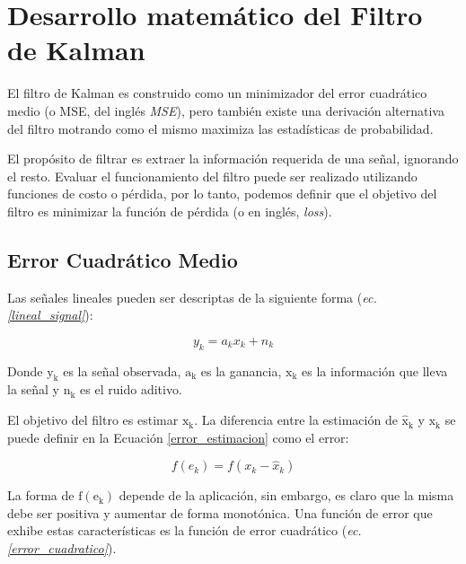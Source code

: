 \documentclass[10pt,a4paper]{article}
\begin{document}
\newpage

\printbibliography[heading=bibintoc]

\newpage

\appendix 

\section{Desarrollo matem\'atico del Filtro de Kalman}\label{matKalman}

\noindent El filtro de Kalman es construido como un minimizador del error 
cuadr\'atico medio (o \acrshort{MSE}, del ingl\'es 
\emph{\acrlong{MSE}}), pero tambi\'en existe una derivaci\'on 
alternativa del filtro motrando como el mismo maximiza las estad\'isticas de 
probabilidad.

\noindent El prop\'osito de filtrar es extraer la informaci\'on requerida de una
señal, ignorando el resto. Evaluar el funcionamiento del filtro puede ser
realizado utilizando funciones de costo o p\'erdida, por lo tanto, podemos
definir que el objetivo del filtro es minimizar la funci\'on de p\'erdida (o en
ingl\'es, \emph{loss}).

\subsection{Error Cuadr\'atico Medio}

\noindent Las señales lineales pueden ser descriptas de la siguiente forma
(\emph{ec.\ref{lineal_signal}}):

\begin{equation}
    y_k = a_k x_k + n_k \label{lineal_signal}
\end{equation}

\noindent Donde $\mathrm{y_k}$ es la señal observada, $\mathrm{a_k}$ es la 
ganancia, $\mathrm{x_k}$ es la informaci\'on que lleva la señal y $\mathrm{n_k}$ 
es el ruido aditivo.

\noindent El objetivo del filtro es estimar $\mathrm{x_k}$. La diferencia entre
la estimaci\'on de $\mathrm{\hat{x}_k}$ y $\mathrm{x_k}$ se puede definir en la
Ecuaci\'on \ref{error_estimacion} como el error:

\begin{equation}
    f(e_k) = f(x_k - \hat{x}_k) \label{error_estimacion}
\end{equation}

La forma de $\mathrm{f(e_k)}$ depende de la aplicaci\'on, sin embargo, es claro
que la misma debe ser positiva y aumentar de forma monot\'onica. Una funci\'on
de error que exhibe estas caracter\'isticas es la funci\'on de error
cuadr\'atico (\emph{ec. \ref{error_cuadratico}}).
\end{document}
